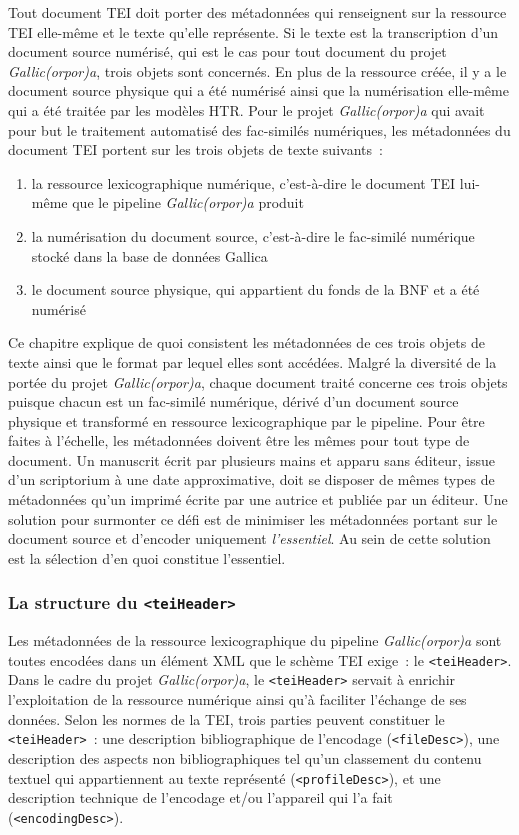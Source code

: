 \documentclass[class=article, crop=false]{standalone}
\begin{document}
Tout document \acrshort{TEI} doit porter des métadonnées qui renseignent sur la ressource \acrshort{TEI} elle-même et le texte qu'elle représente. Si le texte est la transcription d'un document source numérisé, qui est le cas pour tout document du projet \textit{Gallic(orpor)a}, trois objets sont concernés. En plus de la ressource créée, il y a le document source physique qui a été numérisé ainsi que la numérisation elle-même qui a été traitée par les modèles \acrshort{HTR}. Pour le projet \textit{Gallic(orpor)a} qui avait pour but le traitement automatisé des fac-similés numériques, les métadonnées du document \acrshort{TEI} portent sur les trois objets de texte suivants~:
\begin{enumerate}
\item la ressource lexicographique numérique, c'est-à-dire le document \acrshort{TEI} lui-même que le pipeline \textit{Gallic(orpor)a} produit
\item la numérisation du document source, c'est-à-dire le fac-similé numérique stocké dans la base de données Gallica
\item le document source physique, qui appartient du fonds de la \acrlong{BNF} et a été numérisé
\end{enumerate}


Ce chapitre explique de quoi consistent les métadonnées de ces trois objets de texte ainsi que le format par lequel elles sont accédées. Malgré la diversité de la portée du projet \textit{Gallic(orpor)a}, chaque document traité concerne ces trois objets puisque chacun est un fac-similé numérique, dérivé d'un document source physique et transformé en ressource lexicographique par le pipeline. Pour être faites à l'échelle, les métadonnées doivent être les mêmes pour tout type de document. Un manuscrit écrit par plusieurs mains et apparu sans éditeur, issue d'un scriptorium à une date approximative, doit se disposer de mêmes types de métadonnées qu'un imprimé écrite par une autrice et publiée par un éditeur. Une solution pour surmonter ce défi est de minimiser les métadonnées portant sur le document source et d'encoder uniquement \textit{l'essentiel}. Au sein de cette solution est la sélection d'en quoi constitue l'essentiel.

\subsubsection{La structure du \texttt{<teiHeader>}}
Les métadonnées de la ressource lexicographique du pipeline \textit{Gallic(orpor)a} sont toutes encodées dans un élément \acrshort{XML} que le schème \acrshort{TEI} exige~: le \texttt{<teiHeader>}. Dans le cadre du projet \textit{Gallic(orpor)a}, le \texttt{<teiHeader>} servait à enrichir l'exploitation de la ressource numérique ainsi qu'à faciliter l'échange de ses données. Selon les normes de la \acrshort{TEI}, trois parties peuvent constituer le \texttt{<teiHeader>}~: une description bibliographique de l'encodage (\texttt{<fileDesc>}), une description des aspects non bibliographiques tel qu'un classement du contenu textuel qui appartiennent au texte représenté (\texttt{<profileDesc>}), et une description technique de l'encodage et/ou l'appareil qui l'a fait (\texttt{<encodingDesc>}).
\end{document}
